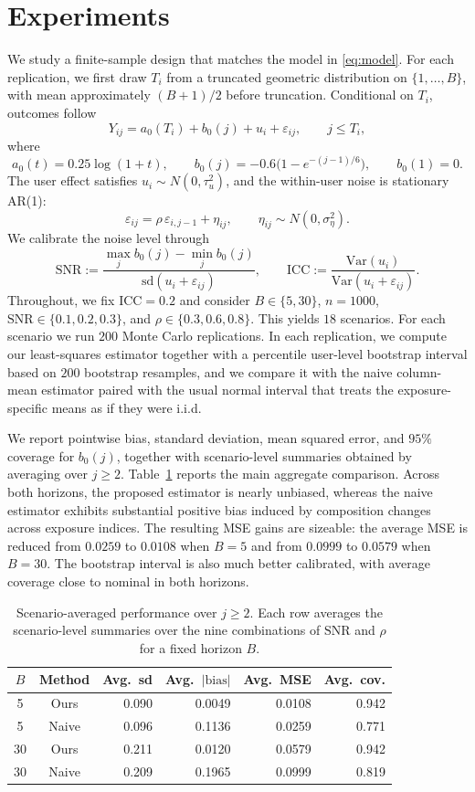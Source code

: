 \documentclass[sigconf,anonymous,review]{acmart}
\begin{document}
\section{Experiments}

We study a finite-sample design that matches the model in \eqref{eq:model}. For each replication, we first draw $T_i$ from a truncated geometric distribution on $\{1,\dots,B\}$, with mean approximately $(B+1)/2$ before truncation. Conditional on $T_i$, outcomes follow
\[
Y_{ij}=a_0(T_i)+b_0(j)+u_i+\varepsilon_{ij},
\qquad j\le T_i,
\]
where
\[
a_0(t)=0.25\log(1+t),
\qquad
b_0(j)=-0.6\bigl(1-e^{-(j-1)/6}\bigr),
\qquad
b_0(1)=0.
\]
The user effect satisfies $u_i\sim N(0,\tau_u^2)$, and the within-user noise is stationary AR(1):
\[
\varepsilon_{ij}=\rho\,\varepsilon_{i,j-1}+\eta_{ij},
\qquad
\eta_{ij}\sim N(0,\sigma_\eta^2).
\]
We calibrate the noise level through
\[
\mathrm{SNR}
:=
\frac{\max_j b_0(j)-\min_j b_0(j)}
{\mathrm{sd}(u_i+\varepsilon_{ij})},
\qquad
\mathrm{ICC}
:=
\frac{\mathrm{Var}(u_i)}
{\mathrm{Var}(u_i+\varepsilon_{ij})}.
\]
Throughout, we fix $\mathrm{ICC}=0.2$ and consider $B\in\{5,30\}$, $n=1000$, $\mathrm{SNR}\in\{0.1,0.2,0.3\}$, and $\rho\in\{0.3,0.6,0.8\}$. This yields $18$ scenarios. For each scenario we run $200$ Monte Carlo replications. In each replication, we compute our least-squares estimator together with a percentile user-level bootstrap interval based on $200$ bootstrap resamples, and we compare it with the naive column-mean estimator paired with the usual normal interval that treats the exposure-specific means as if they were i.i.d.

We report pointwise bias, standard deviation, mean squared error, and $95\%$ coverage for $b_0(j)$, together with scenario-level summaries obtained by averaging over $j\ge 2$. Table~\ref{tab:sim-summary} reports the main aggregate comparison. Across both horizons, the proposed estimator is nearly unbiased, whereas the naive estimator exhibits substantial positive bias induced by composition changes across exposure indices. The resulting MSE gains are sizeable: the average MSE is reduced from $0.0259$ to $0.0108$ when $B=5$ and from $0.0999$ to $0.0579$ when $B=30$. The bootstrap interval is also much better calibrated, with average coverage close to nominal in both horizons.

\begin{table}[t]
\centering
\caption{Scenario-averaged performance over $j\ge 2$. Each row averages the scenario-level summaries over the nine combinations of $\mathrm{SNR}$ and $\rho$ for a fixed horizon $B$.}
\label{tab:sim-summary}
\begin{tabular}{ccrrrr}
\toprule
$B$ & Method & Avg.\ sd & Avg.\ $|\mathrm{bias}|$ & Avg.\ MSE & Avg.\ cov. \\
\midrule
5  & Ours  & 0.090 & 0.0049 & 0.0108 & 0.942 \\
5  & Naive & 0.096 & 0.1136 & 0.0259 & 0.771 \\
30 & Ours  & 0.211 & 0.0120 & 0.0579 & 0.942 \\
30 & Naive & 0.209 & 0.1965 & 0.0999 & 0.819 \\
\bottomrule
\end{tabular}
\end{table}
\end{document}
